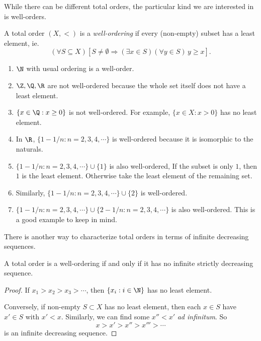 \documentclass[a4paper]{article}
\begin{document}
While there can be different total orders, the particular kind we are interested in is well-orders.
\begin{defi}
  A total order $(X, <)$ is a \emph{well-ordering} if every (non-empty) subset has a least element, ie.
  \[
    (\forall S\subseteq X)[S\not= \emptyset \Rightarrow  (\exists x\in S)(\forall y\in S)\, y \geq x].
  \]
\end{defi}

\begin{eg}\leavevmode
  \begin{enumerate}
    \item $\N$ with usual ordering is a well-order.
    \item $\Z, \Q, \R$ are not well-ordered because the whole set itself does not have a least element.
    \item $\{x\in \Q: x\geq 0\}$ is not well-ordered. For example, $\{x\in X: x> 0\}$ has no least element.
    \item In $\R$, $\{1 - 1/n: n = 2, 3, 4, \cdots\}$ is well-ordered because it is isomorphic to the naturals.
    \item $\{1 - 1/n: n = 2, 3, 4, \cdots\} \cup \{1\}$ is also well-ordered, If the subset is only $1$, then $1$ is the least element. Otherwise take the least element of the remaining set.
    \item Similarly, $\{1 - 1/n: n = 2, 3, 4, \cdots\}\cup \{2\}$ is well-ordered.
    \item $\{1 - 1/n: n = 2, 3, 4, \cdots\} \cup \{2 - 1/n: n = 2, 3, 4, \cdots\}$ is also well-ordered. This is a good example to keep in mind.
  \end{enumerate}
\end{eg}

There is another way to characterize total orders in terms of infinite decreasing sequences.
\begin{prop}
  A total order is a well-ordering if and only if it has no infinite strictly decreasing sequence.
\end{prop}

\begin{proof}
  If $x_1 > x_2 > x_3 > \cdots$, then $\{x_i: i\in \N\}$ has no least element.

  Conversely, if non-empty $S\subset X$ has no least element, then each $x\in S$ have $x'\in S$ with $x' < x$. Similarly, we can find some $x'' < x'$ \emph{ad infinitum}. So
  \[
    x > x' > x'' > x''' > \cdots
  \]
  is an infinite decreasing sequence.
\end{proof}
\end{document}
